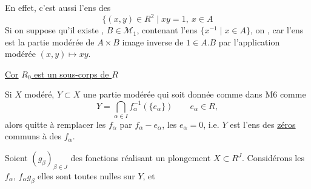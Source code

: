 
En effet, c'est aussi l'ens des
\[
\{(x,y)\in R^2\mid xy=1,\ x\in A
\]
Si on suppose qu'il existe , $B\in\mathcal M_1$, contenant l'ens  $\{x^{-1}\mid x\in A\}$, on , car l'ens est la partie modérée de $A\times B$ image inverse de $1\in A.B$  par l'application modérée $(x,y)\mapsto xy$.

\uline{Cor} \uline{$R_0$ est un sous-corps de $R$}


Si $X$ modéré, $Y\subset X$ une partie modérée qui soit donnée comme dans M6 comme
\[
Y=\bigcap_{\alpha\in I} f_\alpha^{-1}(\{e_\alpha\})\qquad e_\alpha\in R,
\]
alors quitte à remplacer les $f_\alpha$ par $f_\alpha-e_\alpha$,  les $e_\alpha=0$, i.e. $Y$ est l'ens des \uline{zéros} communs à des $f_\alpha$.

Soient $(g_\beta)_{\beta\in J}$  des fonctions  réalisant un plongement $X\subset R^J$. Considérons les $f_\alpha$, $f_\alpha g_\beta$  elles sont toutes nulles sur $Y$, et

